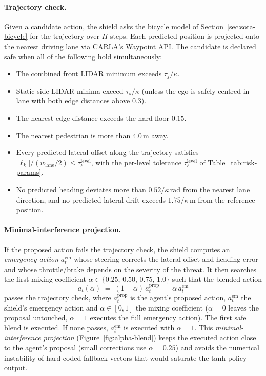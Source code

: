 \paragraph{Trajectory check.}
Given a candidate action, the shield asks the bicycle model of Section~\ref{sec:sota-bicycle}
for the trajectory over \(H\) steps. Each predicted position is projected onto the nearest
driving lane via CARLA's Waypoint API. The candidate is declared safe when all of the following
hold simultaneously:
\begin{itemize}
  \item The combined front LIDAR minimum exceeds \(\tau_f / \kappa\).
  \item Static side LIDAR minima exceed \(\tau_s / \kappa\) (unless the ego is safely centred
        in lane with both edge distances above \(0.3\)).
  \item The nearest edge distance exceeds the hard floor \(0.15\).
  \item The nearest pedestrian is more than \(4.0\,\mathrm{m}\) away.
  \item Every predicted lateral offset along the trajectory satisfies
        \(|\ell_k| / (w_{\mathrm{lane}}/2) \le \tau_\ell^{\mathrm{level}}\), with the per-level
        tolerance \(\tau_\ell^{\mathrm{level}}\) of Table~\ref{tab:risk-params}.
  \item No predicted heading deviates more than \(0.52/\kappa\,\mathrm{rad}\) from the
        nearest lane direction, and no predicted lateral drift exceeds \(1.75/\kappa\,\mathrm{m}\)
        from the reference position.
\end{itemize}

\paragraph{Minimal-interference projection.}
If the proposed action fails the trajectory check, the shield computes an \emph{emergency action}
\(a^{\mathrm{em}}_t\) whose steering corrects the lateral offset and heading error and whose
throttle/brake depends on the severity of the threat. It then searches the first mixing coefficient
\(\alpha \in \{0.25,\, 0.50,\, 0.75,\, 1.0\}\) such that the blended action
\begin{equation}
  a_t(\alpha) \;=\; (1-\alpha)\,a^{\mathrm{prop}}_t \;+\; \alpha\,a^{\mathrm{em}}_t
  \label{eq:alpha-blend}
\end{equation}
passes the trajectory check, where \(a^{\mathrm{prop}}_t\) is the agent's proposed action,
\(a^{\mathrm{em}}_t\) the shield's emergency action and \(\alpha\in[0,1]\) the mixing coefficient
(\(\alpha = 0\) leaves the proposal untouched, \(\alpha = 1\) executes the full emergency action).
The first safe blend is executed. If none passes, \(a^{\mathrm{em}}_t\) is executed with
\(\alpha = 1\). This \emph{minimal-interference projection} (Figure~\ref{fig:alpha-blend}) keeps
the executed action close to the agent's proposal (small corrections use \(\alpha = 0.25\)) and
avoids the numerical instability of hard-coded fallback vectors that would saturate the tanh
policy output.

